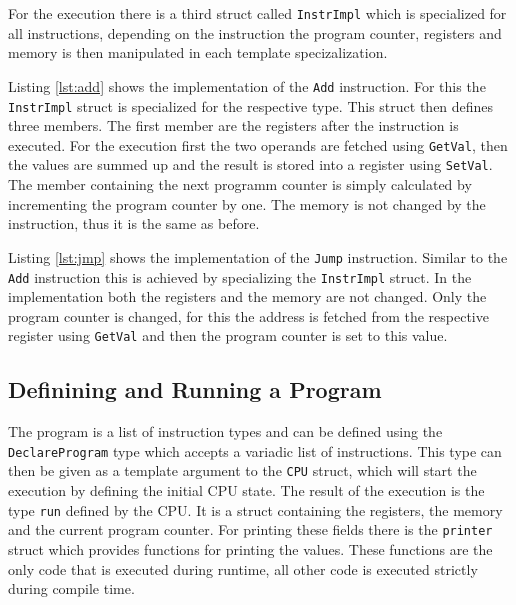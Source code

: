For the execution there is a third struct called \lstinline{InstrImpl} which is
specialized for all instructions, depending on the instruction the program counter,
registers and memory is then manipulated in each template specizalization.

Listing \ref{lst:add} shows the implementation of the \lstinline{Add} instruction.
For this the \lstinline{InstrImpl} struct is specialized for the respective type.
This struct then defines three members. The first member are the registers after the
instruction is executed. For the execution first the two operands are fetched using
\lstinline{GetVal}, then the values are summed up and the result is stored into a
register using \lstinline{SetVal}. The member containing the next programm counter
is simply calculated by incrementing the program counter by one. The memory is not
changed by the instruction, thus it is the same as before.



Listing \ref{lst:jmp} shows the implementation of the \lstinline{Jump} instruction.
Similar to the \lstinline{Add} instruction this is achieved by specializing the 
\lstinline{InstrImpl} struct. In the implementation both the registers and the memory
are not changed. Only the program counter is changed, for this the address is fetched
from the respective register using \lstinline{GetVal} and then the program counter is
set to this value.




\subsection{Definining and Running a Program}
The program is a list of instruction types and can be defined using the 
\lstinline{DeclareProgram} type which accepts a variadic list of instructions. 
This type can then be given as a template argument to the \lstinline{CPU} struct, which will start the execution by defining
the initial CPU state. The result of the execution is the type \lstinline{run} defined
by the CPU. It is a struct containing the registers, the memory and the current program
counter. For printing these fields there is the \lstinline{printer} struct which
provides functions for printing the values. These functions are the only code that is
executed during runtime, all other code is executed strictly during compile time.

